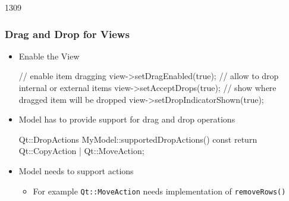 \begin{slide}[fragile]{1309}
  \frametitle{Drag and Drop for Views}
  \begin{itemize}
  \item Enable the View
 \begin{cpp}
// enable item dragging
view->setDragEnabled(true);
// allow to drop internal or external items
view->setAcceptDrops(true);
// show where dragged item will be dropped
view->setDropIndicatorShown(true);
 \end{cpp}
\medskip
\item Model has to provide support for drag and drop operations
  \begin{cpp}
Qt::DropActions MyModel::supportedDropActions() const
{
  return Qt::CopyAction | Qt::MoveAction;
}    
  \end{cpp}
\item Model needs to support actions
  \begin{itemize}
  \item For example \texttt{Qt::MoveAction} needs implementation of \texttt{removeRows()}
  \end{itemize}

  \end{itemize}
\end{slide}

